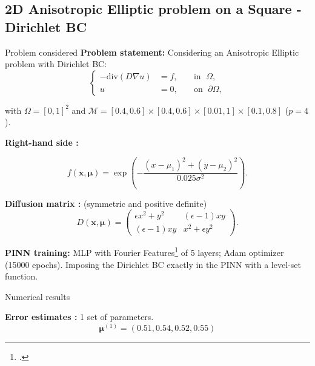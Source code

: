 \subsection{2D Anisotropic Elliptic problem on a Square - Dirichlet BC}

\begin{frame}{Problem considered} 
	\textbf{Problem statement:} Considering an Anisotropic Elliptic problem with Dirichlet BC:
	\vspace{-5pt}
	\begin{equation*}
		\left\{
		\begin{aligned}
			-\text{div}(D\nabla u) & = f, \; &  & \text{in } \; \Omega, \\
			u         & =0, \;  &  & \text{on } \; \partial\Omega,
		\end{aligned}
		\right.
	\end{equation*}

	with $\Omega=[0,1]^2$ and $\mathcal{M}=[0.4, 0.6]\times [0.4, 0.6]\times [0.01,1]\times [0.1,0.8]$ ($p=4$).
	
	\vspace{8pt}
	\textbf{Right-hand side :}

	\vspace{-5pt}
	\begin{equation*}
		f(\bm{x},\bm{\mu})=\exp\left(-\frac{(x-\mu_1)^2+(y-\mu_2)^2}{0.025\sigma^2}\right).
	\end{equation*}
	
	\textbf{Diffusion matrix :} (symmetric and positive definite)
	\begin{equation*}
		D(\bm{x},\bm{\mu})=\begin{pmatrix}
			\epsilon x^2+y^2 & (\epsilon-1)xy \\
			(\epsilon-1)xy & x^2+\epsilon y^2
		\end{pmatrix}.
	\end{equation*}

	\vspace{2pt}
	\textbf{PINN training:} MLP with Fourier Features\footcite{TanSri2020} of 5 layers; Adam optimizer (15000 epochs). Imposing the Dirichlet BC exactly in the PINN with a level-set function.

	\vspace{5pt}
\end{frame}

\begin{frame}{Numerical results}
	\hspace{-5pt}\begin{minipage}[t]{0.46\linewidth}
		\textbf{Error estimates :} 1 set of parameters.
		$$\bm{\mu}^{(1)}=(0.51,0.54,0.52,0.55)$$
		\vspace{-35pt}
		\begin{figure}[H]
		\end{figure}
	\end{minipage} \qquad \small
	\begin{minipage}[t]{0.48\linewidth}
	\end{minipage}
\end{frame}

